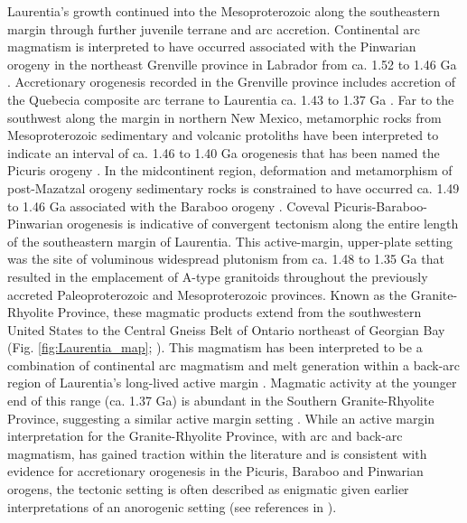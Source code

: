 \documentclass[twocolumn, switch]{article} %
\begin{document}
Laurentia's growth continued into the Mesoproterozoic along the southeastern margin through further juvenile terrane and arc accretion. Continental arc magmatism is interpreted to have occurred associated with the Pinwarian orogeny in the northeast Grenville province in Labrador from ca. 1.52 to 1.46 Ga \citep{Gower2002a}. Accretionary orogenesis recorded in the Grenville province includes accretion of the Quebecia composite arc terrane to Laurentia ca. 1.43 to 1.37 Ga \citep{Groulier2020a}. Far to the southwest along the margin in northern New Mexico, metamorphic rocks from Mesoproterozoic sedimentary and volcanic protoliths have been interpreted to indicate an interval of ca. 1.46 to 1.40 Ga orogenesis that has been named the Picuris orogeny \citep{Daniel2013a, Aronoff2016a}. In the midcontinent region,  deformation and metamorphism of post-Mazatzal orogeny sedimentary rocks is constrained to have occurred ca. 1.49 to 1.46 Ga associated with the Baraboo orogeny \citep{Medaris2003a, Holm2019a}. Coveval Picuris-Baraboo-Pinwarian orogenesis is indicative of convergent tectonism along the entire length of the southeastern margin of Laurentia. This active-margin, upper-plate setting was the site of voluminous widespread plutonism from ca. 1.48 to 1.35 Ga that resulted in the emplacement of A-type granitoids throughout the previously accreted Paleoproterozoic and Mesoproterozoic provinces. Known as the Granite-Rhyolite Province, these magmatic products extend from the southwestern United States to the Central Gneiss Belt of Ontario northeast of Georgian Bay (Fig. \ref{fig:Laurentia_map}; \citealp{Slagstad2009a}). This magmatism has been interpreted to be a combination of continental arc magmatism and melt generation within a back-arc region of Laurentia's long-lived active margin \citep{Bickford2015a}. Magmatic activity at the younger end of this range (ca. 1.37 Ga) is abundant in the Southern Granite-Rhyolite Province, suggesting a similar active margin setting \citep{Bickford2015a}. While an active margin interpretation for the Granite-Rhyolite Province, with arc and back-arc magmatism, has gained traction within the literature and is consistent with evidence for accretionary orogenesis in the Picuris, Baraboo and Pinwarian orogens, the tectonic setting is often described as enigmatic given earlier interpretations of an anorogenic setting (see references in \citealp{Slagstad2009a}).
\end{document}
